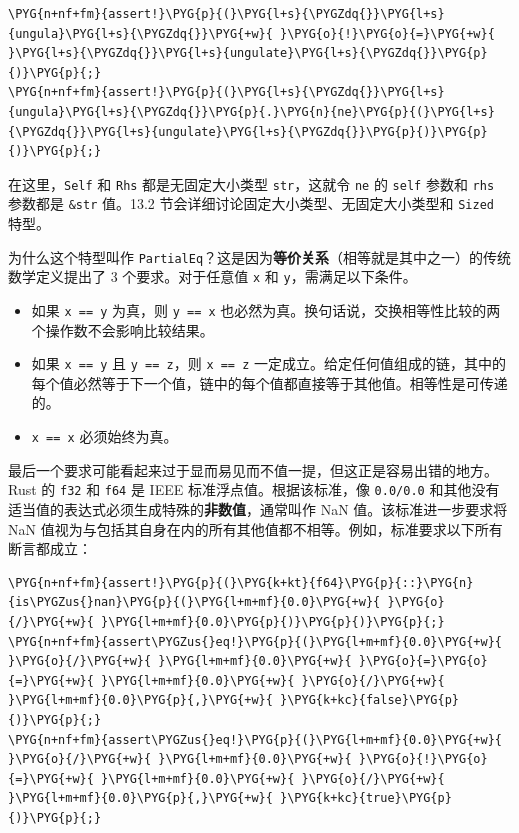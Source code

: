 \begin{Verbatim}[commandchars=\\\{\},breaklines=true,breakanywhere=true,fontsize=\codefont,xleftmargin=17bp]
\PYG{n+nf+fm}{assert!}\PYG{p}{(}\PYG{l+s}{\PYGZdq{}}\PYG{l+s}{ungula}\PYG{l+s}{\PYGZdq{}}\PYG{+w}{ }\PYG{o}{!}\PYG{o}{=}\PYG{+w}{ }\PYG{l+s}{\PYGZdq{}}\PYG{l+s}{ungulate}\PYG{l+s}{\PYGZdq{}}\PYG{p}{)}\PYG{p}{;}
\PYG{n+nf+fm}{assert!}\PYG{p}{(}\PYG{l+s}{\PYGZdq{}}\PYG{l+s}{ungula}\PYG{l+s}{\PYGZdq{}}\PYG{p}{.}\PYG{n}{ne}\PYG{p}{(}\PYG{l+s}{\PYGZdq{}}\PYG{l+s}{ungulate}\PYG{l+s}{\PYGZdq{}}\PYG{p}{)}\PYG{p}{)}\PYG{p}{;}
\end{Verbatim}

在这里，\texttt{Self} 和 \texttt{Rhs} 都是无固定大小类型 \texttt{str}，这就令 \texttt{ne} 的 \texttt{self} 参数和 \texttt{rhs} 参数都是 \texttt{\&str} 值。13.2 节会详细讨论固定大小类型、无固定大小类型和 \texttt{Sized} 特型。

为什么这个特型叫作 \texttt{PartialEq}？这是因为\textbf{等价关系}（相等就是其中之一）的传统数学定义提出了 3 个要求。对于任意值 \texttt{x} 和 \texttt{y}，需满足以下条件。

\begin{itemize}
\item 如果 \texttt{x == y} 为真，则 \texttt{y == x} 也必然为真。换句话说，交换相等性比较的两个操作数不会影响比较结果。
\item 如果 \texttt{x == y} 且 \texttt{y == z}，则 \texttt{x == z} 一定成立。给定任何值组成的链，其中的每个值必然等于下一个值，链中的每个值都直接等于其他值。相等性是可传递的。
\item \texttt{x == x} 必须始终为真。
\end{itemize}

最后一个要求可能看起来过于显而易见而不值一提，但这正是容易出错的地方。Rust 的 \texttt{f32} 和 \texttt{f64} 是 IEEE 标准浮点值。根据该标准，像 \texttt{0.0/0.0} 和其他没有适当值的表达式必须生成特殊的\textbf{非数值}，通常叫作 NaN 值。该标准进一步要求将 NaN 值视为与包括其自身在内的所有其他值都不相等。例如，标准要求以下所有断言都成立：

\begin{Verbatim}[commandchars=\\\{\},breaklines=true,breakanywhere=true,fontsize=\codefont,xleftmargin=17bp]
\PYG{n+nf+fm}{assert!}\PYG{p}{(}\PYG{k+kt}{f64}\PYG{p}{::}\PYG{n}{is\PYGZus{}nan}\PYG{p}{(}\PYG{l+m+mf}{0.0}\PYG{+w}{ }\PYG{o}{/}\PYG{+w}{ }\PYG{l+m+mf}{0.0}\PYG{p}{)}\PYG{p}{)}\PYG{p}{;}
\PYG{n+nf+fm}{assert\PYGZus{}eq!}\PYG{p}{(}\PYG{l+m+mf}{0.0}\PYG{+w}{ }\PYG{o}{/}\PYG{+w}{ }\PYG{l+m+mf}{0.0}\PYG{+w}{ }\PYG{o}{=}\PYG{o}{=}\PYG{+w}{ }\PYG{l+m+mf}{0.0}\PYG{+w}{ }\PYG{o}{/}\PYG{+w}{ }\PYG{l+m+mf}{0.0}\PYG{p}{,}\PYG{+w}{ }\PYG{k+kc}{false}\PYG{p}{)}\PYG{p}{;}
\PYG{n+nf+fm}{assert\PYGZus{}eq!}\PYG{p}{(}\PYG{l+m+mf}{0.0}\PYG{+w}{ }\PYG{o}{/}\PYG{+w}{ }\PYG{l+m+mf}{0.0}\PYG{+w}{ }\PYG{o}{!}\PYG{o}{=}\PYG{+w}{ }\PYG{l+m+mf}{0.0}\PYG{+w}{ }\PYG{o}{/}\PYG{+w}{ }\PYG{l+m+mf}{0.0}\PYG{p}{,}\PYG{+w}{ }\PYG{k+kc}{true}\PYG{p}{)}\PYG{p}{;}
\end{Verbatim}

